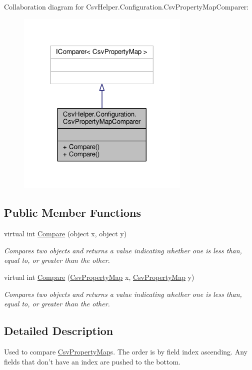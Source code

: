 Collaboration diagram for Csv\-Helper.\-Configuration.\-Csv\-Property\-Map\-Comparer\-:
\nopagebreak
\begin{figure}[H]
\begin{center}
\leavevmode
\includegraphics[width=234pt]{d1/d05/a00423}
\end{center}
\end{figure}
\subsection*{Public Member Functions}
\begin{DoxyCompactItemize}
\item 
virtual int \hyperlink{a00052_a41ab777503459b3984a2e2826a14d52a}{Compare} (object x, object y)
\begin{DoxyCompactList}\small\item\em Compares two objects and returns a value indicating whether one is less than, equal to, or greater than the other. \end{DoxyCompactList}\item 
virtual int \hyperlink{a00052_ab9c855cf5389c8f1ae1b476d508ade5d}{Compare} (\hyperlink{a00050}{Csv\-Property\-Map} x, \hyperlink{a00050}{Csv\-Property\-Map} y)
\begin{DoxyCompactList}\small\item\em Compares two objects and returns a value indicating whether one is less than, equal to, or greater than the other. \end{DoxyCompactList}\end{DoxyCompactItemize}


\subsection{Detailed Description}
Used to compare \hyperlink{a00050}{Csv\-Property\-Map}s. The order is by field index ascending. Any fields that don't have an index are pushed to the bottom. 



